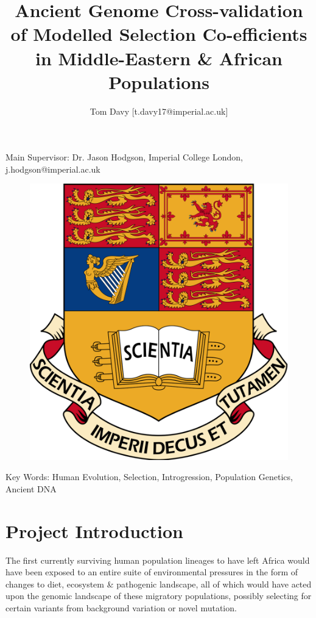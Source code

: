 \documentclass[11pt, a4paper]{article}
\begin{document}
\vspace{20cm}
\title{Ancient Genome Cross-validation of Modelled Selection Co-efficients in Middle-Eastern \& African 		Populations}
\author{Tom Davy [t.davy17@imperial.ac.uk]}	
\maketitle
Main Supervisor: Dr. Jason Hodgson, Imperial College London, j.hodgson@imperial.ac.uk


\begin{figure}
 \centering
\vspace{1cm}
\includegraphics[scale=0.13]{Imperial.png}
\end{figure}


\pagebreak
\linenumbers

Key Words: Human Evolution, Selection, Introgression, Population Genetics, Ancient DNA
\section{Project Introduction}
The first currently surviving human population lineages to have left Africa would have been exposed to an entire suite of environmental pressures in the form of changes to diet, ecosystem \& pathogenic landscape, all of which would have acted upon the genomic landscape of these migratory populations, possibly selecting for certain variants from background variation or novel mutation. 
\end{document}
